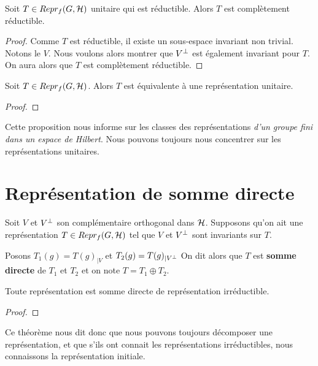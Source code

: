 \begin{proposition}
	Soit $T \in Repr_{f}(G, \mathcal{H})$ unitaire qui est réductible. Alors $T$
	est complètement réductible.
\end{proposition}

\begin{proof}
	Comme $T$ est réductible, il existe un sous-espace invariant non trivial.
	Notons le $V$.
	Nous voulons alors montrer que $V^{\perp}$ est également invariant pour
	$T$. On aura alors que $T$ est complètement réductible.
\end{proof}

\begin{proposition}
	Soit $T \in Repr_{f}(G, \mathcal{H})$. Alors $T$ est équivalente à une
	représentation unitaire.
\end{proposition}

\begin{proof}
	
\end{proof}

Cette proposition nous informe sur les classes des représentations \textit{d'un groupe
fini dans un espace de Hilbert}. Nous pouvons toujours nous concentrer sur les
représentations unitaires.

\section{Représentation de somme directe}

\begin{definition}
	Soit $V$ et $V^{\perp}$ son complémentaire orthogonal dans $\mathcal{H}$.
	Supposons qu'on ait une représentation $T \in Repr_{f}(G, \mathcal{H})$ tel que
	$V$ et $V^{\perp}$ sont invariants sur $T$.

	Posons $T_{1}(g) = T(g)_{|V}$ et $T_{2}(g) = T(g)_{|V^{\perp}}$
	On dit alors que $T$ est \textbf{somme directe} de $T_{1}$ et $T_{2}$ et on
	note $T = T_{1} \oplus T_{2}$.
\end{definition}


\begin{theorem}
	Toute représentation est somme directe de représentation irréductible.
\end{theorem}

\begin{proof}
	
\end{proof}

Ce théorème nous dit donc que nous pouvons toujours décomposer une
représentation, et que s'ils ont connait les représentations irréductibles, nous
connaissons la représentation initiale.

